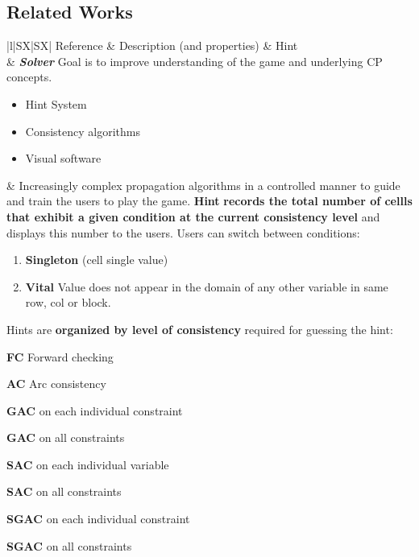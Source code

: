 \documentclass[a4paper,UKenglish,cleveref, autoref, cleveref, thm-restate,pdfa]{lipics-v2021}
\begin{document}
	
	\newpage
	\begin{landscape}
		\section{Related Works}
		
		\begin{table}[!h]
			\begin{tabularx}{\linewidth}{|l|S{X}|S{X}|}
				\Xhline{1.5pt}
				Reference & Description (and properties) & Hint \\
				\Xhline{1.5pt}
				\cite{reeson2007interactive} & \textbf{\textit{Solver}} Goal is to improve understanding of the game and underlying CP concepts. 
				\begin{itemize}
					\item Hint System
					\item Consistency algorithms
					\item Visual software
				\end{itemize} & Increasingly complex propagation algorithms in a controlled manner to guide and train the users to play the game. 
				\textbf{Hint} \textbf{records the total number of cellls that exhibit a given condition at the current consistency level} and displays this number to the users. Users can switch between conditions:
				\begin{enumerate}
					\item \textbf{Singleton} (cell single value)
					\item \textbf{Vital} Value does not appear in the domain of any other variable in same row, col or block.
				\end{enumerate}
				Hints are \textbf{organized by level of consistency} required for guessing the hint: 
				\begin{inparaenum}[(1)]
					\item \textbf{FC} Forward checking
					\item \textbf{AC} Arc consistency
					\item \textbf{GAC }on each individual constraint
					\item \textbf{GAC }on all constraints
					\item \textbf{SAC }on each individual variable
					\item \textbf{SAC }on all constraints
					\item \textbf{SGAC }on each individual constraint
					\item \textbf{SGAC }on all constraints
				\end{inparaenum}\\	\hline
			\end{tabularx}
		\end{table}
		

\end{landscape}
\end{document}
